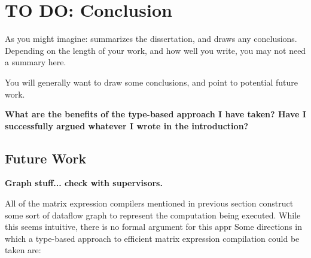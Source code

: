 \chapter{TO DO: Conclusion}

\begin{guidance}
    As you might imagine: summarizes the dissertation, and draws
    any conclusions. Depending on the length of your work, and
    how well you write, you may not need a summary here.

    You will generally want to draw some conclusions, and point
    to potential future work.
\end{guidance}

\textbf{What are the benefits of the type-based approach I have taken? Have I successfully 
argued whatever I wrote in the introduction?}

\section{Future Work}

\textbf{Graph stuff... check with supervisors.}

All of the matrix expression compilers mentioned in previous section construct
some sort of dataflow graph to represent the computation being executed. While
this seems intuitive, there is no formal argument for this  appr
Some directions in which a type-based approach to efficient matrix expression compilation could
be taken are:

